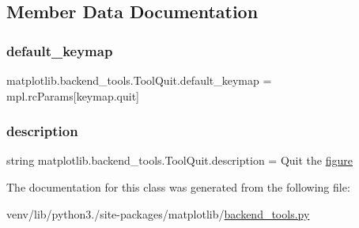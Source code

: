 \subsection{Member Data Documentation}
\mbox{\label{classmatplotlib_1_1backend__tools_1_1ToolQuit_a2df7f88c6bb8d638bc5f5f97e2b584d0}} 
\subsubsection{\texorpdfstring{default\+\_\+keymap}{default\_keymap}}
{\footnotesize\ttfamily matplotlib.\+backend\+\_\+tools.\+Tool\+Quit.\+default\+\_\+keymap = mpl.\+rc\+Params\mbox{[}\textquotesingle{}keymap.\+quit\textquotesingle{}\mbox{]}\hspace{0.3cm}{\ttfamily [static]}}

\mbox{\label{classmatplotlib_1_1backend__tools_1_1ToolQuit_ab6518832a8dde5cd75449fc2856c0703}} 
\subsubsection{\texorpdfstring{description}{description}}
{\footnotesize\ttfamily string matplotlib.\+backend\+\_\+tools.\+Tool\+Quit.\+description = \textquotesingle{}Quit the \hyperlink{classmatplotlib_1_1backend__tools_1_1ToolBase_af85e83d1db0787aa40d06837204651ee}{figure}\textquotesingle{}\hspace{0.3cm}{\ttfamily [static]}}



The documentation for this class was generated from the following file\+:\begin{DoxyCompactItemize}
\item 
venv/lib/python3./site-\/packages/matplotlib/\hyperlink{backend__tools_8py}{backend\+\_\+tools.\+py}\end{DoxyCompactItemize}
